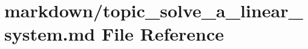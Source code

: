 \hypertarget{topic__solve__a__linear__system_8md}{}\section{markdown/topic\+\_\+solve\+\_\+a\+\_\+linear\+\_\+system.md File Reference}
\label{topic__solve__a__linear__system_8md}
